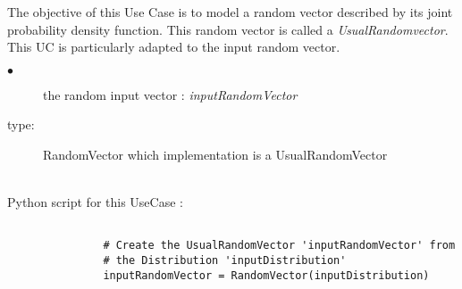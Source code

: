 \renewcommand{\filename}{docUC_InputNoData_InputRandomVector.tex}
\renewcommand{\filetitle}{UC : Creation  of the random input vector from a distribution}

\HeaderIIILevel


\label{UsualRandomVector}



The objective of this Use Case is to model a random  vector described by its joint probability density function. This random vector is called a {\itshape UsualRandomvector}. This UC is particularly adapted to the input random vector.\\


\noindent%
             {
               \begin{description}
               \item[$\bullet$] the random input vector : {\itshape inputRandomVector}
               \item[type:] RandomVector which implementation is a UsualRandomVector
               \end{description}
             }

             \textspace\\
             Python script for this UseCase :


             \begin{lstlisting}

               # Create the UsualRandomVector 'inputRandomVector' from
               # the Distribution 'inputDistribution'
               inputRandomVector = RandomVector(inputDistribution)
             \end{lstlisting}
